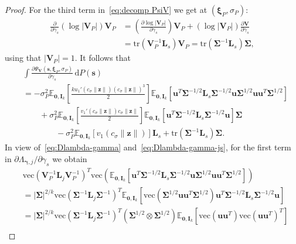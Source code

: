 \documentclass{article}
\numberwithin{equation}{section}
\theoremstyle{plain}
\newcommand{\dd}{\mathrm{d}}
\newcommand{\vc}{\mathrm{vec}}
\newcommand{\bxi}{\bm\xi}
\newcommand{\bgamma}{\bm\gamma}
\newcommand{\bSigma}{\mathbf{\Sigma}}
\newcommand{\bs}{\mathbf{s}}
\newcommand{\bu}{\mathbf{u}}
\newcommand{\bz}{\mathbf{z}}
\newcommand{\bV}{\mathbf{V}}
\newcommand{\bI}{\mathbf{I}}
\newcommand{\bL}{\mathbf{L}}
\newcommand{\E}{\mathbb{E}}
\begin{document}
\begin{proof}
For the third term in~\eqref{eq:decomp PsiV} we get at $(\bxi_P,\sigma_P)$:
\begin{equation}
\label{eq:term3 decomp PsiV}
\begin{split}
\frac{\partial}{\partial\gamma_s}
(\log|\bV_P|)\mathbf{V}_P
&=
\left(
\frac{\partial\log|\bV_P|}{\partial\gamma_s}
\right)
\bV_P
+
\left(
\log|\bV_P|
\right)
\frac{\partial\bV}{\partial\gamma_s}\\
&=
\text{tr}
\left(
\bV_P^{-1}\bL_s
\right)
\bV_P
=
\text{tr}
\left(
\bSigma^{-1}\bL_s
\right)
\bSigma,
\end{split}
\end{equation}
using that $|\bV_P|=1$.
It follows that 
\begin{equation}
\label{eq:Dlambda-gamma-js}
\begin{split}
&
\int
\frac{\partial\Psi_{\bV}(\bs,\bxi_P,\sigma_P)}{\partial \gamma_s}
\,\dd P(\bs)\\
&=
-
\sigma_P^2
\E_{\mathbf{0},\bI_k}
\left[
\frac{ku_1'\left(c_\sigma\|\bz\|\right)(c_\sigma\|\bz\|)^3}{2}
\right]
\E_{\mathbf{0},\bI_k}
\left[
\bu^T\bSigma^{-1/2}\bL_s\bSigma^{-1/2}\bu
\bSigma^{1/2}\bu\bu^T\bSigma^{1/2}
\right]\\
&\qquad+
\sigma_P^2
\E_{\mathbf{0},\bI_k}
\left[
\frac{v_1'\left(c_\sigma\|\bz\|\right)c_\sigma\|\bz\|}{2}
\right]
\E_{\mathbf{0},\bI_k}
\left[
\bu^T\bSigma^{-1/2}\bL_s\bSigma^{-1/2}\bu
\right]
\bSigma\\
&\qquad\qquad-
\sigma_P^2
\E_{\mathbf{0},\bI_k}
\left[
v_1\left(c_\sigma\|\bz\|\right)
\right]
\bL_s
+
\text{tr}
\left(
\bSigma^{-1}\bL_s
\right)
\bSigma.
\end{split}
\end{equation}
In view of~\eqref{eq:Dlambda-gamma} and~\eqref{eq:Dlambda-gamma-js}, for the first term in $\partial\Lambda_{\bgamma,j}/\partial\gamma_s$
we obtain
\[
\begin{split}
&
\vc(\bV_P^{-1}\bL_j\bV_P^{-1})^T
\vc\left(
\E_{\mathbf{0},\bI_k}
\left[
\bu^T\bSigma^{-1/2}\bL_s\bSigma^{-1/2}\bu
\bSigma^{1/2}\bu\bu^T\bSigma^{1/2}
\right]
\right)\\
&=
|\bSigma|^{2/k}
\vc(\bSigma^{-1}\bL_j\bSigma^{-1})^T
\E_{\mathbf{0},\bI_k}
\left[
\vc\left(
\bSigma^{1/2}\bu\bu^T\bSigma^{1/2}
\right)
\bu^T\bSigma^{-1/2}\bL_s\bSigma^{-1/2}\bu
\right]\\
&=
|\bSigma|^{2/k}
\vc(\bSigma^{-1}\bL_j\bSigma^{-1})^T
(\bSigma^{1/2}\otimes\bSigma^{1/2})
\E_{\mathbf{0},\bI_k}
\left[
\vc\left(
\bu\bu^T
\right)
\vc(\bu\bu^T)^T
\right]\\

\end{split}\]
\end{proof}
\end{document}
